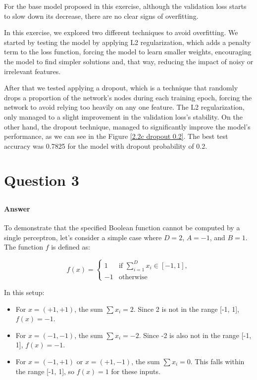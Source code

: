 \documentclass{article}
\begin{document}
For the base model proposed in this exercise, although the validation loss starts to slow down its decrease, there are no clear signs 
of overfitting. 

In this exercise, we explored two different techniques to avoid overfitting. We started by testing the model by applying L2 regularization, which adds 
a penalty term to the loss function, forcing the model to learn smaller weights, encouraging the model to find simpler solutions and, that way, reducing 
the impact of noisy or irrelevant features. 

After that we tested applying a dropout, which is a technique that randomly drops a proportion of the network's nodes during each training epoch, 
forcing the network to avoid relying too heavily on any one feature. The L2 regularization, only managed to a slight improvement in the 
validation loss's stability. On the other hand, the dropout technique, managed to significantly improve the model's performance,
as we can see in the Figure \ref{2.2c dropout 0.2}. The best test accuracy was 0.7825 for the model with dropout probability of 0.2.



\section{Question 3}

\subsection{}
\subsubsection{}
\paragraph{Answer}

To demonstrate that the specified Boolean function cannot be computed by a single perceptron, let's consider a simple case where \( D = 2 \), \( A = -1 \), and \( B = 1 \). The function \( f \) is defined as:

\[
f(x) = 
\begin{cases} 
1 & \text{if } \sum_{i=1}^{D} x_i \in [-1, 1], \\
-1 & \text{otherwise}
\end{cases}
\]

In this setup:

\begin{itemize}
    \item For \( x = (+1, +1) \), the sum \( \sum x_i = 2 \). Since 2 is not in the range [-1, 1], \( f(x) = -1 \).
    \item For \( x = (-1, -1) \), the sum \( \sum x_i = -2 \). Since -2 is also not in the range [-1, 1], \( f(x) = -1 \).
    \item For \( x = (-1, +1) \) or \( x = (+1, -1) \), the sum \( \sum x_i = 0 \). This falls within the range [-1, 1], so \( f(x) = 1 \) for these inputs.
\end{itemize}
\end{document}

